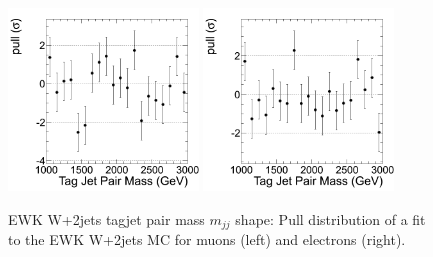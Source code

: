 \begin{figure}
\begin{center}
\includegraphics[width=0.45\textwidth]{figs/wpj/EWKW2jetstagjetmjj_EWKW2jets_muon_Model_12_Validate_pull.png}
\includegraphics[width=0.45\textwidth]{figs/wpj/EWKW2jetstagjetmjj_EWKW2jets_electron_Model_12_Validate_pull.png}
\end{center}
\caption{\label{fig:topFit} EWK W+2jets tagjet pair mass $m_{jj}$ shape: Pull distribution of a fit to the EWK W+2jets MC for muons (left) and electrons (right).}
\label{fig:ewkw2jets_Dijet_Pull}
\end{figure}

